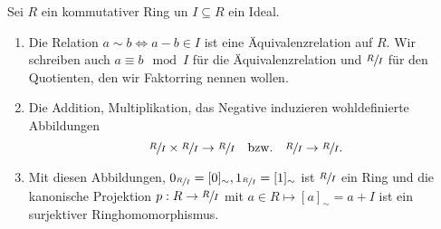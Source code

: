\begin{theorem}
Sei $R$ ein kommutativer Ring un $I \subseteq R$ ein Ideal.
\begin{enumerate}
	\item Die Relation $a \sim b \Leftrightarrow a - b \in I$ ist eine Äquivalenzrelation auf $R$.
		Wir schreiben auch $a \equiv b \mod I$ für die Äquivalenzrelation und $\sfrac{R}{I}$ für den Quotienten, den wir Faktorring nennen wollen.
	\item Die Addition, Multiplikation, das Negative induzieren wohldefinierte Abbildungen
		\[
			\sfrac{R}{I} \times \sfrac{R}{I} \to \sfrac{R}{I} \qq{bzw.} \sfrac{R}{I} \to \sfrac{R}{I}
		.\] 
	\item Mit diesen Abbildungen, $0_{\sfrac{R}{I}} = [0]_{\sim}, 1_{\sfrac{R}{I}} = [1]_{\sim}$ ist $\sfrac{R}{I}$ ein Ring und die kanonische Projektion
		$p: R \to \sfrac{R}{I}$ mit $a \in R \mapsto [a]_{\sim} = a + I$ ist ein surjektiver Ringhomomorphismus.
\end{enumerate}
\end{theorem}

